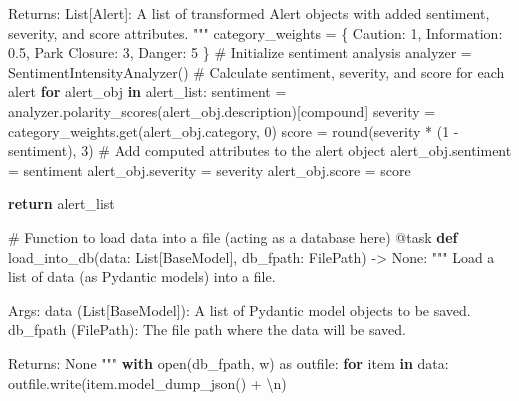 \documentclass[
  letterpaper,
  DIV=11,
  numbers=noendperiod]{scrartcl}
\newenvironment{Shaded}{\begin{snugshade}}{\end{snugshade}}
\newcommand{\AttributeTok}[1]{\textcolor[rgb]{0.40,0.45,0.13}{#1}}
\newcommand{\BuiltInTok}[1]{\textcolor[rgb]{0.00,0.23,0.31}{#1}}
\newcommand{\CharTok}[1]{\textcolor[rgb]{0.13,0.47,0.30}{#1}}
\newcommand{\CommentTok}[1]{\textcolor[rgb]{0.37,0.37,0.37}{#1}}
\newcommand{\ControlFlowTok}[1]{\textcolor[rgb]{0.00,0.23,0.31}{\textbf{#1}}}
\newcommand{\DecValTok}[1]{\textcolor[rgb]{0.68,0.00,0.00}{#1}}
\newcommand{\FloatTok}[1]{\textcolor[rgb]{0.68,0.00,0.00}{#1}}
\newcommand{\ImportTok}[1]{\textcolor[rgb]{0.00,0.46,0.62}{#1}}
\newcommand{\KeywordTok}[1]{\textcolor[rgb]{0.00,0.23,0.31}{\textbf{#1}}}
\newcommand{\NormalTok}[1]{\textcolor[rgb]{0.00,0.23,0.31}{#1}}
\newcommand{\OperatorTok}[1]{\textcolor[rgb]{0.37,0.37,0.37}{#1}}
\newcommand{\StringTok}[1]{\textcolor[rgb]{0.13,0.47,0.30}{#1}}
\newcommand{\VariableTok}[1]{\textcolor[rgb]{0.07,0.07,0.07}{#1}}
\begin{document}
\begin{Shaded}
\begin{Highlighting}[]
\CommentTok{    Returns:}
\CommentTok{        List[Alert]: A list of transformed Alert objects with added sentiment, severity, and score attributes.}
\CommentTok{    """}
\NormalTok{    category\_weights }\OperatorTok{=}\NormalTok{ \{}
        \StringTok{\textquotesingle{}Caution\textquotesingle{}}\NormalTok{: }\DecValTok{1}\NormalTok{,}
        \StringTok{\textquotesingle{}Information\textquotesingle{}}\NormalTok{: }\FloatTok{0.5}\NormalTok{,}
        \StringTok{\textquotesingle{}Park Closure\textquotesingle{}}\NormalTok{: }\DecValTok{3}\NormalTok{,}
        \StringTok{\textquotesingle{}Danger\textquotesingle{}}\NormalTok{: }\DecValTok{5}
\NormalTok{    \}}
    \CommentTok{\# Initialize sentiment analysis}
\NormalTok{    analyzer }\OperatorTok{=}\NormalTok{ SentimentIntensityAnalyzer()}
    \CommentTok{\# Calculate sentiment, severity, and score for each alert}
    \ControlFlowTok{for}\NormalTok{ alert\_obj }\KeywordTok{in}\NormalTok{ alert\_list:}
\NormalTok{        sentiment }\OperatorTok{=}\NormalTok{ analyzer.polarity\_scores(alert\_obj.description)[}\StringTok{\textquotesingle{}compound\textquotesingle{}}\NormalTok{]}
\NormalTok{        severity }\OperatorTok{=}\NormalTok{ category\_weights.get(alert\_obj.category, }\DecValTok{0}\NormalTok{)}
\NormalTok{        score }\OperatorTok{=} \BuiltInTok{round}\NormalTok{(severity }\OperatorTok{*}\NormalTok{ (}\DecValTok{1} \OperatorTok{{-}}\NormalTok{ sentiment), }\DecValTok{3}\NormalTok{)}
        \CommentTok{\# Add computed attributes to the alert object}
\NormalTok{        alert\_obj.sentiment }\OperatorTok{=}\NormalTok{ sentiment}
\NormalTok{        alert\_obj.severity }\OperatorTok{=}\NormalTok{ severity}
\NormalTok{        alert\_obj.score }\OperatorTok{=}\NormalTok{ score}

    \ControlFlowTok{return}\NormalTok{ alert\_list}

\CommentTok{\# Function to load data into a file (acting as a database here)}
\AttributeTok{@task}
\KeywordTok{def}\NormalTok{ load\_into\_db(data: List[BaseModel], db\_fpath: FilePath) }\OperatorTok{{-}\textgreater{}} \VariableTok{None}\NormalTok{:}
    \CommentTok{"""}
\CommentTok{    Load a list of data (as Pydantic models) into a file.}

\CommentTok{    Args:}
\CommentTok{        data (List[BaseModel]): A list of Pydantic model objects to be saved.}
\CommentTok{        db\_fpath (FilePath): The file path where the data will be saved.}

\CommentTok{    Returns:}
\CommentTok{        None}
\CommentTok{    """}
    \ControlFlowTok{with} \BuiltInTok{open}\NormalTok{(db\_fpath, }\StringTok{\textquotesingle{}w\textquotesingle{}}\NormalTok{) }\ImportTok{as}\NormalTok{ outfile:}
        \ControlFlowTok{for}\NormalTok{ item }\KeywordTok{in}\NormalTok{ data:}
\NormalTok{            outfile.write(item.model\_dump\_json() }\OperatorTok{+} \StringTok{\textquotesingle{}}\CharTok{\textbackslash{}n}\StringTok{\textquotesingle{}}\NormalTok{)}


\end{Highlighting}
\end{Shaded}
\end{document}

